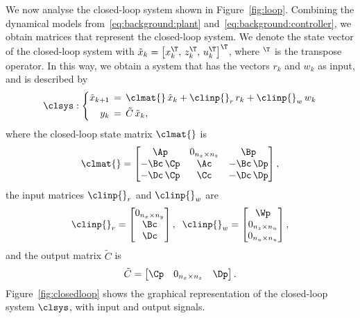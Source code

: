 We now analyse the closed-loop system shown in Figure~\ref{fig:loop}.
Combining the dynamical models from~\eqref{eq:background:plant} and~\eqref{eq:background:controller}, we obtain matrices that represent the closed-loop system.
We denote the state vector of the closed-loop system with $\tilde{x}_k = \left[ x_k^\T,\, z_k^\T,\, u_k^\T \right]^\T$, where $^\T$ is the transpose operator.
In this way, we obtain a system that has the vectors $r_k$ and $w_k$ as input, and is described by
%
\begin{equation} 
\label{eq:feedback-basic}
    \clsys : \left\{
    \begin{aligned}
        \tilde{x}_{k+1} &\,=\, \clmat{}\,\tilde{x}_{k} + \clinp{}_r\,r_{k} + \clinp{}_w\,w_{k}\\
        y_{k} &\,=\, \tilde C\,\tilde{x}_{k},
    \end{aligned} \right.
\end{equation}
%
where the closed-loop state matrix $\clmat{}$ is
%
\begin{equation}
\label{eq:matrixA}
    \clmat{} =
    \begin{bmatrix} \Ap       & 0_{n_x \times n_z} & \Bp \\
                    -\Bc\,\Cp & \Ac                                      & -\Bc\,\Dp \\
                    -\Dc\,\Cp & \Cc                                      & -\Dc\,\Dp
    \end{bmatrix},
\end{equation}
%
the input matrices $\clinp{}_r$ and $\clinp{}_w$ are
%
\begin{equation}
    \clinp{}_r = \begin{bmatrix} 0_{n_x \times n_y} \\ \Bc \\ \Dc \end{bmatrix},\;\;
    \clinp{}_w = \begin{bmatrix} \Wp \\ 0_{n_z \times n_u} \\ 0_{n_u \times n_u} \end{bmatrix},
\end{equation}
%
and the output matrix $\tilde C$ is
%
\begin{equation}
    \tilde C = \begin{bmatrix} \Cp & 0_{n_x \times n_z} & \Dp \end{bmatrix}.
\end{equation}
%
Figure~\ref{fig:closedloop} shows the graphical representation of the closed-loop system $\clsys$, with input and output signals.

